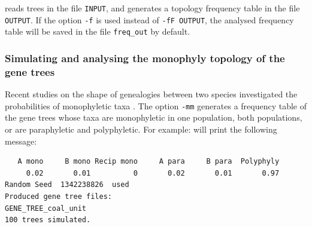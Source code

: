 reads trees in the file {\tt INPUT}, and generates a topology frequency table in the file {\tt OUTPUT}.
If the option {\tt -f} is used instead of {\tt -fF OUTPUT}, the analysed frequency table will be saved in the file {\tt freq\_out} by default.

\subsubsection{Simulating and analysing the monophyly topology of the gene trees}
Recent studies on the shape of genealogies between two species investigated the probabilities of monophyletic taxa \citep{Eldon2012,Rosenberg2003}. The option {\tt -mm} generates a frequency table of the gene trees whose taxa are monophyletic in one population, both populations, or are paraphyletic and polyphyletic.
For example:
will print the following message:
\begin{verbatim}
   A mono     B mono Recip mono     A para     B para  Polyphyly
     0.02       0.01          0       0.02       0.01       0.97
Random Seed  1342238826  used
Produced gene tree files:
GENE_TREE_coal_unit
100 trees simulated.
\end{verbatim}




